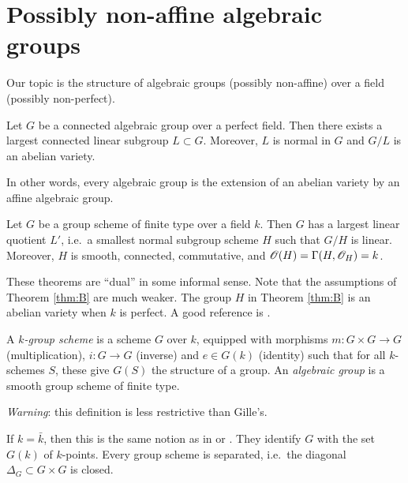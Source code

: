 
\section{Possibly non-affine algebraic groups}



Our topic is the structure of algebraic groups (possibly non-affine) over 
a field (possibly non-perfect). 

\begin{theo}\label{thm:A}
Let $G$ be a connected algebraic group over a perfect field. Then there exists 
a largest connected linear subgroup $L\subset G$. Moreover, $L$ is normal 
in $G$ and $G/L$ is an abelian variety. 
\end{theo}

In other words, every algebraic group is the extension of an abelian variety by 
an affine algebraic group. 

\begin{theo}\label{thm:B}
Let $G$ be a group scheme of finite type over a field $k$. Then $G$ has a 
largest linear quotient $L'$, i.e.~a smallest normal subgroup scheme $H$ such 
that $G/H$ is linear. Moreover, $H$ is smooth, connected, commutative, and 
$\mathscr{O}(H) = \Gamma(H,\mathscr{O}_H) = k$. 
\end{theo}

These theorems are ``dual'' in some informal sense. Note that the assumptions 
of Theorem \ref{thm:B} are much weaker. The group $H$ in Theorem \ref{thm:B} 
is an abelian variety when $k$ is perfect. 
A good reference is \cite{m14}. 

\begin{defi}
A \emph{$k$-group scheme} is a scheme $G$ over $k$, equipped with morphisms 
$m:G\times G\to G$ (multiplication), $i:G\to G$ (inverse) and 
$e\in G(k)$ (identity) such that for all $k$-schemes $S$, these give 
$G(S)$ the structure of a group. An \emph{algebraic group} is a smooth group 
scheme of finite type. 
\end{defi}

\emph{Warning}: this definition is less restrictive than Gille's. 

If $k=\bar k$, then this is the same notion as in \cite{b91} or \cite{s09}. 
They identify $G$ with the set $G(k)$ of $k$-points. 
Every group scheme is separated, i.e.\ the diagonal $\Delta_G\subset G\times G$ 
is closed. 

